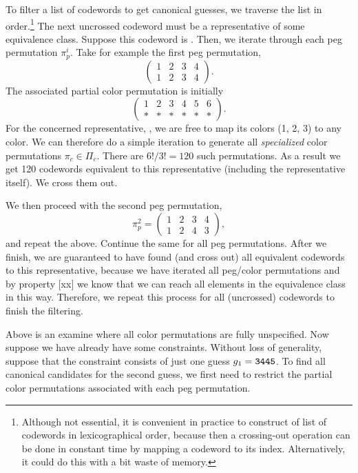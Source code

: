 To filter a list of codewords to get canonical guesses, we traverse the list in order.\footnote{Although not essential, it is convenient in practice to construct of list of codewords in lexicographical order, because then a crossing-out operation can be done in constant time by mapping a codeword to its index. Alternatively, it could do this with a bit waste of memory.} 
The next uncrossed codeword must be a representative of some equivalence class. Suppose this codeword is . Then, we iterate through each peg permutation $\pi_p^i$. Take for example the first peg permutation,
\[
\begin{pmatrix}
1 & 2 & 3 & 4 \\
1 & 2 & 3 & 4
\end{pmatrix} .
\]
The associated partial color permutation is initially
\[
\begin{pmatrix}
1 & 2 & 3 & 4 & 5 & 6 \\
* & * & * & * & * & * 
\end{pmatrix} .
\]
For the concerned representative, , we are free to map its colors (1, 2, 3) to any color. We can therefore do a simple iteration to generate all \emph{specialized} color permutations $\pi_c \in \Pi_c$. There are $6! / 3! = 120$ such permutations. As a result we get 120 codewords equivalent to this representative (including the representative itself). We cross them out.

We then proceed with the second peg permutation,
\[
\pi_p^2 = 
\begin{pmatrix}
1 & 2 & 3 & 4 \\
1 & 2 & 4 & 3
\end{pmatrix} ,
\] 
and repeat the above. Continue the same for all peg permutations. After we finish, we are guaranteed to have found (and cross out) all equivalent codewords to this representative, because we have iterated all peg/color permutations and by property [xx] we know that we can reach all elements in the equivalence class in this way. Therefore, we repeat this process for all (uncrossed) codewords to finish the filtering.

Above is an examine where all color permutations are fully unspecified. Now suppose we have already have some constraints. Without loss of generality, suppose that the constraint consists of just one guess $g_1 = \texttt{3445}$. To find all canonical candidates for the second guess, we first need to restrict the partial color permutations associated with each peg permutation. 

